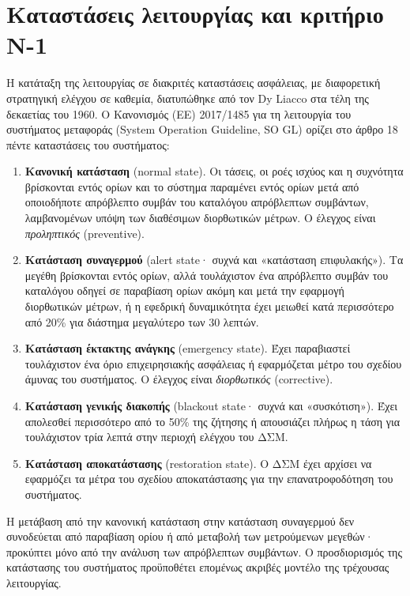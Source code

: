 \section{Καταστάσεις λειτουργίας και κριτήριο N-1}
\label{sec:states}

Η κατάταξη της λειτουργίας σε διακριτές καταστάσεις ασφάλειας, με διαφορετική στρατηγική
ελέγχου σε καθεμία, διατυπώθηκε από τον Dy Liacco στα τέλη της δεκαετίας του 1960. Ο
Κανονισμός (ΕΕ) 2017/1485 για τη λειτουργία του συστήματος μεταφοράς (System Operation
Guideline, SO GL) ορίζει στο άρθρο 18 πέντε καταστάσεις του συστήματος:

\begin{enumerate}
\item \textbf{Κανονική κατάσταση} (normal state). Οι τάσεις, οι ροές ισχύος και η συχνότητα
      βρίσκονται εντός ορίων και το σύστημα παραμένει εντός ορίων μετά από οποιοδήποτε
      απρόβλεπτο συμβάν του καταλόγου απρόβλεπτων συμβάντων, λαμβανομένων υπόψη των
      διαθέσιμων διορθωτικών μέτρων. Ο έλεγχος είναι \emph{προληπτικός} (preventive).
\item \textbf{Κατάσταση συναγερμού} (alert state· συχνά και «κατάσταση επιφυλακής»). Τα
      μεγέθη βρίσκονται εντός ορίων, αλλά τουλάχιστον ένα απρόβλεπτο συμβάν του καταλόγου
      οδηγεί σε παραβίαση ορίων ακόμη και μετά την εφαρμογή διορθωτικών μέτρων, ή η
      εφεδρική δυναμικότητα έχει μειωθεί κατά περισσότερο από 20\% για διάστημα
      μεγαλύτερο των 30 λεπτών.
\item \textbf{Κατάσταση έκτακτης ανάγκης} (emergency state). Έχει παραβιαστεί τουλάχιστον
      ένα όριο επιχειρησιακής ασφάλειας ή εφαρμόζεται μέτρο του σχεδίου άμυνας του
      συστήματος. Ο έλεγχος είναι \emph{διορθωτικός} (corrective).
\item \textbf{Κατάσταση γενικής διακοπής} (blackout state· συχνά και «συσκότιση»). Έχει
      απολεσθεί περισσότερο από το 50\% της ζήτησης ή απουσιάζει πλήρως η τάση για
      τουλάχιστον τρία λεπτά στην περιοχή ελέγχου του ΔΣΜ.
\item \textbf{Κατάσταση αποκατάστασης} (restoration state). Ο ΔΣΜ έχει αρχίσει να
      εφαρμόζει τα μέτρα του σχεδίου αποκατάστασης για την επανατροφοδότηση του
      συστήματος.
\end{enumerate}

Η μετάβαση από την κανονική κατάσταση στην κατάσταση συναγερμού δεν συνοδεύεται από
παραβίαση ορίου ή από μεταβολή των μετρούμενων μεγεθών· προκύπτει μόνο από την ανάλυση
των απρόβλεπτων συμβάντων. Ο προσδιορισμός της κατάστασης του συστήματος προϋποθέτει
επομένως ακριβές μοντέλο της τρέχουσας λειτουργίας.

